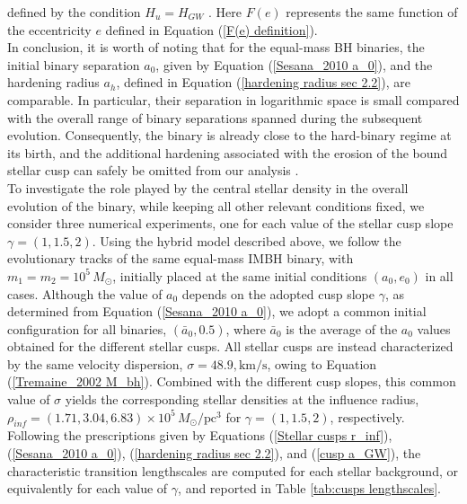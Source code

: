 \documentclass[12pt,twoside,openany]{book}
\begin{document}
defined by the condition $H_u=H_{GW}$ \parencite{Sesana_2010}. Here $F(e)$ represents the same function of the eccentricity $e$ defined in Equation (\ref{F(e) definition}).\\In conclusion, it is worth of noting that for the equal-mass BH binaries, the initial binary separation $a_0$, given by Equation (\ref{Sesana_2010 a_0}), and the hardening radius $a_h$, defined in Equation (\ref{hardening radius sec 2.2}), are comparable. In particular, their separation in logarithmic space is small compared with the overall range of binary separations spanned during the subsequent evolution. Consequently, the binary is already close to the hard-binary regime at its birth, and the additional hardening associated with the erosion of the bound stellar cusp can safely be omitted from our analysis \parencite{Sesana_2015}.\\To investigate the role played by the central stellar density in the overall evolution of the binary, while keeping all other relevant conditions fixed, we consider three numerical experiments, one for each value of the stellar cusp slope $\gamma=(1,1.5,2)$. Using the hybrid model described above, we follow the evolutionary tracks of the same equal-mass IMBH binary, with $m_1=m_2=10^5\,M_\odot$, initially placed at the same initial conditions $(a_0,e_0)$ in all cases. Although the value of $a_0$ depends on the adopted cusp slope $\gamma$, as determined from Equation (\ref{Sesana_2010 a_0}), we adopt a common initial configuration for all binaries, $(\bar{a}_0,0.5)$, where $\bar{a}_0$ is the average of the $a_0$ values obtained for the different stellar cusps. All stellar cusps are instead characterized by the same velocity dispersion, $\sigma=48.9,\mathrm{km/s}$, owing to Equation (\ref{Tremaine_2002 M_bh}). Combined with the different cusp slopes, this common value of $\sigma$ yields the corresponding stellar densities at the influence radius, $\rho_{inf}=(1.71,3.04,6.83)\times10^5 \,M_\odot/\mathrm{pc^3}$ for $\gamma=(1,1.5,2)$, respectively.\\Following the prescriptions given by Equations (\ref{Stellar cusps r_inf}), (\ref{Sesana_2010 a_0}), (\ref{hardening radius sec 2.2}), and (\ref{cusp a_GW}), the characteristic transition lengthscales are computed for each stellar background, or equivalently for each value of $\gamma$, and reported in Table \ref{tab:cusps lengthscales}.
\end{document}

